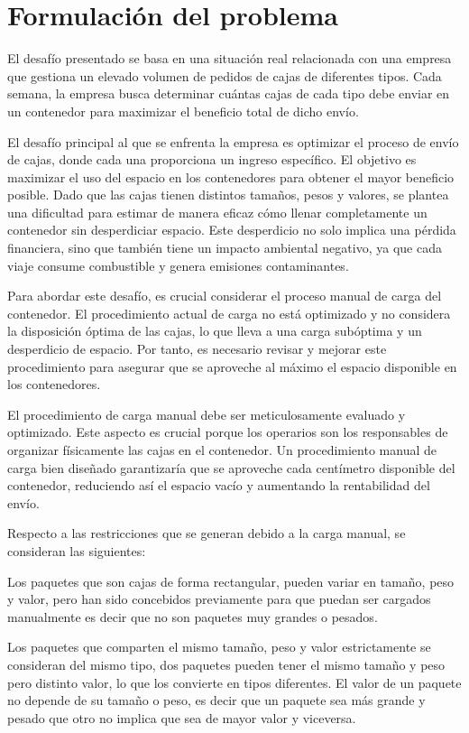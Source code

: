 \section{Formulación del problema}
\label{sec:problem}

El desafío presentado se basa en una situación real relacionada con una empresa que gestiona un elevado volumen de pedidos de cajas de diferentes tipos. Cada semana, la empresa busca determinar cuántas cajas de cada tipo debe enviar en un contenedor para maximizar el beneficio total de dicho envío.

El desafío principal al que se enfrenta la empresa es optimizar el proceso de envío de cajas, donde cada una proporciona un ingreso específico. El objetivo es maximizar el uso del espacio en los contenedores para obtener el mayor beneficio posible. Dado que las cajas tienen distintos tamaños, pesos y valores, se plantea una dificultad para estimar de manera eficaz cómo llenar completamente un contenedor sin desperdiciar espacio. Este desperdicio no solo implica una pérdida financiera, sino que también tiene un impacto ambiental negativo, ya que cada viaje consume combustible y genera emisiones contaminantes.

Para abordar este desafío, es crucial considerar el proceso manual de carga del contenedor. El procedimiento actual de carga no está optimizado y no considera la disposición óptima de las cajas, lo que lleva a una carga subóptima y un desperdicio de espacio. Por tanto, es necesario revisar y mejorar este procedimiento para asegurar que se aproveche al máximo el espacio disponible en los contenedores.

El procedimiento de carga manual debe ser meticulosamente evaluado y optimizado. Este aspecto es crucial porque los operarios son los responsables de organizar físicamente las cajas en el contenedor. Un procedimiento manual de carga bien diseñado garantizaría que se aproveche cada centímetro disponible del contenedor, reduciendo así el espacio vacío y aumentando la rentabilidad del envío.

Respecto a las restricciones que se generan debido a la carga manual, se consideran las siguientes:

Los paquetes que son cajas de forma rectangular, pueden variar en tamaño, peso y valor, pero han sido concebidos previamente para que puedan ser cargados manualmente es decir que no son paquetes muy grandes o pesados.

Los paquetes que comparten el mismo tamaño, peso y valor estrictamente se consideran del mismo tipo, dos paquetes pueden tener el mismo tamaño y peso pero distinto valor, lo que los convierte en tipos diferentes. El valor de un paquete no depende de su tamaño o peso, es decir que un paquete sea más grande y pesado que otro no implica que sea de mayor valor y viceversa.

